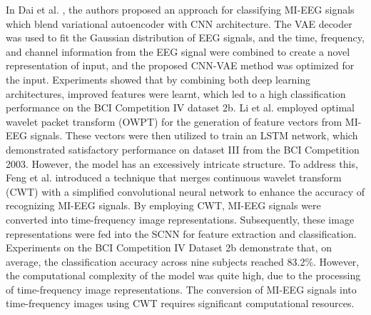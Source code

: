 \documentclass[preprint,12pt]{elsarticle}
\begin{document}
In Dai et al. \citep{dai2019eeg}, the authors proposed an approach for classifying MI-EEG signals which blend variational autoencoder with CNN architecture. The VAE decoder was used to fit the Gaussian distribution of EEG signals, and the time, frequency, and channel information from the EEG signal were combined to create a novel representation of input, and the proposed CNN-VAE method was optimized for the input.  Experiments showed that by combining both deep learning architectures, improved features were learnt, which led to a high classification performance on the BCI Competition IV dataset 2b. Li et al. \citep{LiMingaiLSTM} employed optimal wavelet packet transform (OWPT) for the generation of feature vectors from MI-EEG signals. These vectors were then utilized to train an LSTM network, which demonstrated satisfactory performance on dataset III from the BCI Competition 2003. However, the model has an excessively intricate structure. To address this, Feng et al. \citep{Feng2020novel} introduced a technique that merges continuous wavelet transform (CWT) with a simplified convolutional neural network to enhance the accuracy of recognizing MI-EEG signals. By employing CWT, MI-EEG signals were converted into time-frequency image representations. Subsequently, these image representations were fed into the SCNN for feature extraction and classification. Experiments on the BCI Competition IV Dataset 2b demonstrate that, on average, the classification accuracy across nine subjects reached 83.2\%. However, the computational complexity of the model was quite high, due to the processing of time-frequency image representations. The conversion of MI-EEG signals into time-frequency images using CWT requires significant computational resources. 
\end{document}

